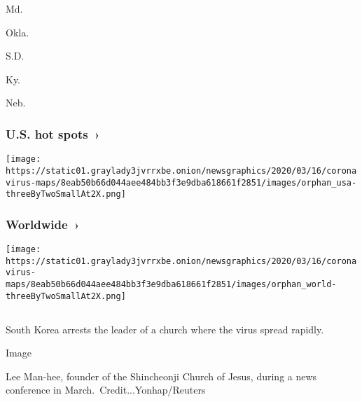 Md.

\href{https://www.nytimes3xbfgragh.onion/interactive/2020/us/oklahoma-coronavirus-cases.html}{}

Okla.

\href{https://www.nytimes3xbfgragh.onion/interactive/2020/us/south-dakota-coronavirus-cases.html}{}

S.D.

\href{https://www.nytimes3xbfgragh.onion/interactive/2020/us/kentucky-coronavirus-cases.html}{}

Ky.

\href{https://www.nytimes3xbfgragh.onion/interactive/2020/us/nebraska-coronavirus-cases.html}{}

Neb.

\href{https://www.nytimes3xbfgragh.onion/interactive/2020/us/coronavirus-us-cases.html}{}

\hypertarget{us-hot-spots-}{%
\subsubsection{U.S. hot spots~›}\label{us-hot-spots-}}

\texttt{[image: https://static01.graylady3jvrrxbe.onion/newsgraphics/2020/03/16/coronavirus-maps/8eab50b66d044aee484bb3f3e9dba618661f2851/images/orphan\_usa-threeByTwoSmallAt2X.png]}

\href{https://www.nytimes3xbfgragh.onion/interactive/2020/world/coronavirus-maps.html}{}

\hypertarget{worldwide-}{%
\subsubsection{Worldwide~›}\label{worldwide-}}

\texttt{[image: https://static01.graylady3jvrrxbe.onion/newsgraphics/2020/03/16/coronavirus-maps/8eab50b66d044aee484bb3f3e9dba618661f2851/images/orphan\_world-threeByTwoSmallAt2X.png]}

\hypertarget{-3}{%
\subsection{}\label{-3}}

South Korea arrests the leader of a church where the virus spread
rapidly.

Image

Lee Man-hee, founder of the Shincheonji Church of Jesus, during a news
conference in March.~Credit...Yonhap/Reuters

